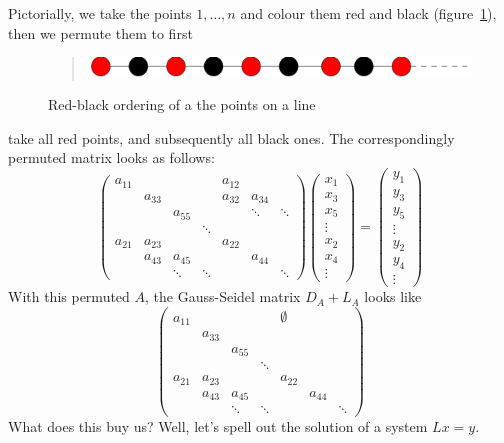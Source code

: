 Pictorially, we take the points $1,\ldots,n$ and colour them red and
black (figure~\ref{fig:red-black-1d}), then we permute them to first
\begin{figure}
  \begin{quote}
    \includegraphics[scale=.12]{graphics-public/red-black-1d}
  \end{quote}
  \caption{Red-black ordering of a the points on a line}
  \label{fig:red-black-1d}
\end{figure}
take all red points, and subsequently all black ones.
The correspondingly permuted matrix looks as follows:
\[ 
\begin{pmatrix}
  a_{11}&&&&a_{12}\\ &a_{33}&&&a_{32}&a_{34}\\ &&a_{55}&&&\ddots&\ddots\\
  &&&\ddots\\
  a_{21}&a_{23}&&&a_{22}\\ &a_{43}&a_{45}&&&a_{44}\\ &&\ddots&\ddots&&&\ddots
\end{pmatrix}
\begin{pmatrix}  x_1\\ x_3\\ x_5\\ \vdots\\ x_2\\ x_4\\ \vdots\end{pmatrix} =
\begin{pmatrix}  y_1\\ y_3\\ y_5\\ \vdots\\ y_2\\ y_4\\ \vdots\end{pmatrix}
\]
With this permuted $A$, the Gauss-Seidel matrix $D_A+L_A$ looks like
\[ 
\begin{pmatrix}
  a_{11}&&&&\emptyset\\ &a_{33}\\ &&a_{55}\\
  &&&\ddots\\
  a_{21}&a_{23}&&&a_{22}\\ &a_{43}&a_{45}&&&a_{44}\\ &&\ddots&\ddots&&&\ddots
\end{pmatrix}
\]
What does this buy us? Well, let's spell out the solution of a system
$Lx=y$.

